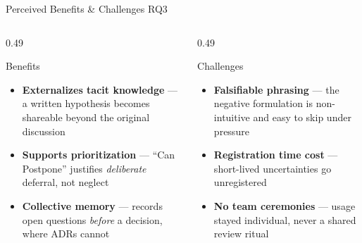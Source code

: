 \documentclass[
  xcolor={hyperref,svgnames,x11names,table},
  hyperref={pdfencoding=unicode,plainpages=false,pdfpagelabels=true,breaklinks=true},
  brazilian,english,12pt,aspectratio=169,
]{beamer}
\begin{document}
\begin{frame}{Perceived Benefits \& Challenges \hfill {\small\normalfont RQ3}}
  \begin{columns}[T]
    \begin{column}{0.49\textwidth}
      \begin{block}{Benefits}
        \footnotesize
        \begin{itemize}\setlength\itemsep{0.55em}
          \item \textbf{Externalizes tacit knowledge} --- a written hypothesis becomes shareable beyond the original discussion
          \item \textbf{Supports prioritization} --- \alert{``Can Postpone''} justifies \emph{deliberate} deferral, not neglect
          \item \textbf{Collective memory} --- records open questions \emph{before} a decision, where ADRs cannot
        \end{itemize}
      \end{block}
    \end{column}
    \begin{column}{0.49\textwidth}
      \begin{block}{Challenges}
        \footnotesize
        \begin{itemize}\setlength\itemsep{0.55em}
          \item \textbf{Falsifiable phrasing} --- the \alert{negative formulation} is non-intuitive and easy to skip under pressure
          \item \textbf{Registration time cost} --- short-lived uncertainties go \alert{unregistered}
          \item \textbf{No team ceremonies} --- usage stayed \alert{individual}, never a shared review ritual
        \end{itemize}
      \end{block}
    \end{column}
  \end{columns}
\end{frame}
\end{document}
